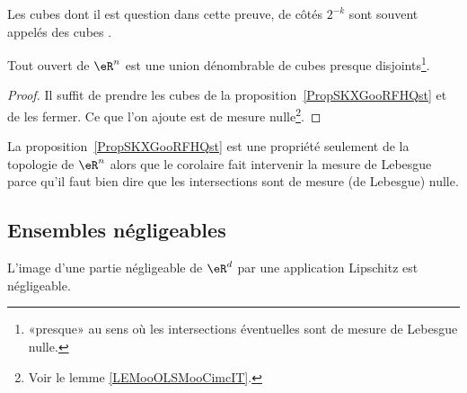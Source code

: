 Les cubes dont il est question dans cette preuve, de côtés \( 2^{-k}\) sont souvent appelés des cubes .

\begin{corollary}     \label{CorTHDQooWMSbJe}
	Tout ouvert de \( \eR^n\) est une union dénombrable de cubes presque disjoints\footnote{«presque» au sens où les intersections éventuelles sont de mesure de Lebesgue nulle.}.
\end{corollary}

\begin{proof}
	Il suffit de prendre les cubes de la proposition~\ref{PropSKXGooRFHQst} et de les fermer. Ce que l'on ajoute est de mesure nulle\footnote{Voir le lemme \ref{LEMooOLSMooCimcIT}.}.
\end{proof}

\begin{remark}
	La proposition~\ref{PropSKXGooRFHQst} est une propriété seulement de la topologie de \( \eR^n\) alors que le corolaire fait intervenir la mesure de Lebesgue parce qu'il faut bien dire que les intersections sont de mesure (de Lebesgue) nulle.
\end{remark}

\subsection{Ensembles négligeables}

\begin{lemma}      \label{LemWHKJooGPuxEN}
	L'image d'une partie négligeable de \( \eR^d\) par une application Lipschitz est négligeable.
\end{lemma}

